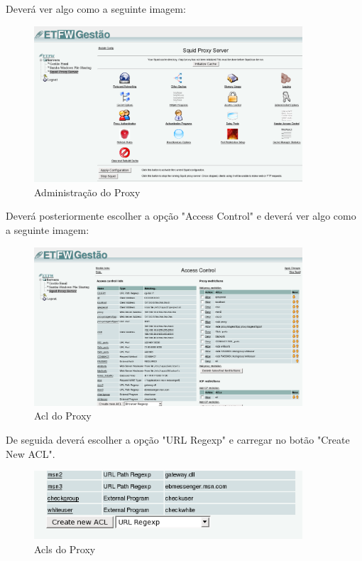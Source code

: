 Deverá ver algo como a seguinte imagem:

\begin{figure}[H]
    \begin{center}
        \includegraphics[width=10cm]{include/img/squid1}
    \end{center}
    \caption{Administração do Proxy}
    \label{fig:SQUID1}
\end{figure}

Deverá posteriormente escolher a opção "Access Control" e deverá ver algo como a seguinte imagem:

\begin{figure}[H]
    \begin{center}
        \includegraphics[width=10cm]{include/img/squid2}
    \end{center}
    \caption{Acl do Proxy}
    \label{fig:SQUID2}
\end{figure}

De seguida deverá escolher a opção "URL Regexp" e carregar no botão "Create New ACL".

\begin{figure}[H]
    \begin{center}
        \includegraphics[width=10cm]{include/img/squid3}
    \end{center}
    \caption{Acls do Proxy}
    \label{fig:SQUID3}
\end{figure}

